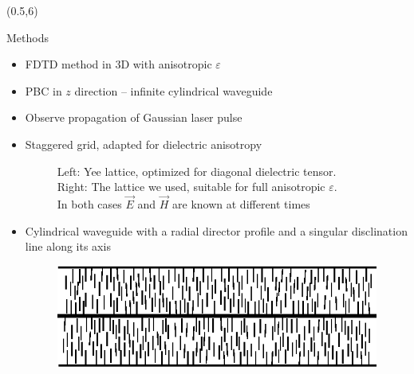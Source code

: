 \documentclass{beamer}
\newcommand{\blockpadding}{
  \rule[-0.6ex]{0pt}{2.5ex}
}
\begin{document}
\begin{textblock}{5.5}(0.5,6)
 \begin{block}{\blockpadding Methods}
 \begin{itemize}
   \setlength{\itemsep}{20pt}
  \item FDTD method in 3D with anisotropic $\varepsilon$
  \item PBC in $z$ direction -- infinite cylindrical waveguide
  \item Observe propagation of Gaussian laser pulse
  \item Staggered grid, adapted for dielectric anisotropy
 \begin{figure}[h]
\centering
\label{fig:lattice}
\caption{{\color{dark} Left:} Yee lattice, optimized for diagonal dielectric tensor. \\{\color{dark} Right:} The lattice we used, suitable for full anisotropic $\varepsilon$. \\In both cases $\vec E$ and $\vec H$ are known at different times}
\end{figure}

\item Cylindrical waveguide with a radial director profile and a singular disclination line along its axis \\
\begin{figure}[h]
\centering
\includegraphics[width=.5\textwidth]{../Magisterij/Slike/director-profile-radial}
\end{figure}

 \end{itemize}
 \end{block}

\end{textblock}
\end{document}
